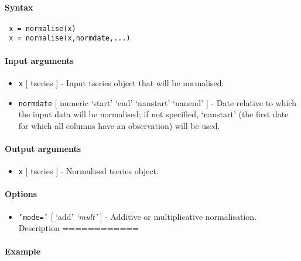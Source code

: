 


	\paragraph{Syntax}
 
 \begin{verbatim}
 x = normalise(x)
 x = normalise(x,normdate,...)
 \end{verbatim}
 
 \paragraph{Input arguments}
 
 \begin{itemize}
 \item
   \texttt{x} {[} tseries {]} - Input tseries object that will be
   normalised.
 \item
   \texttt{normdate} {[} numeric \textbar{} `start' \textbar{} `end'
   \textbar{} `nanstart' \textbar{} `nanend' {]} - Date relative to which
   the input data will be normalised; if not specified, `nanstart' (the
   first date for which all columns have an observation) will be used.
 \end{itemize}
 
 \paragraph{Output arguments}
 
 \begin{itemize}
 \item
   \texttt{x} {[} tseries {]} - Normalised tseries object.
 \end{itemize}
 
 \paragraph{Options}
 
 \begin{itemize}
 \item
   \texttt{'mode='} {[} `add' \textbar{} \emph{`mult'} {]} - Additive or
   multiplicative normalisation. Description ============
 \end{itemize}
 
 \paragraph{Example}


